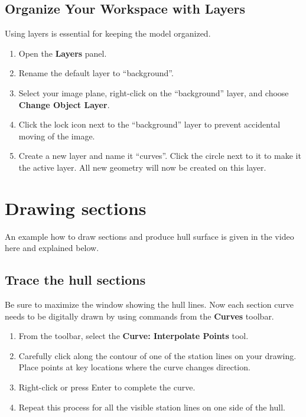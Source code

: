 \documentclass{article}
\begin{document}
\subsection{Organize Your Workspace with Layers}

Using layers is essential for keeping the model organized.

\begin{enumerate}
\item Open the \textbf{Layers} panel.
\item Rename the default layer to ``background''.
\item Select your image plane, right-click on the ``background'' layer, and choose \textbf{Change Object Layer}.
\item Click the lock icon next to the ``background'' layer to prevent accidental moving of the image.
\item Create a new layer and name it ``curves''. Click the circle next to it to make it the active layer. All new geometry will now be created on this layer.
\end{enumerate}

\section{Drawing sections}

An example how to draw sections and produce hull surface is given in the video here and explained below.

\subsection{Trace the hull sections}

Be sure to maximize the window showing the hull lines. Now each section curve needs to be digitally drawn by using commands from the \textbf{Curves} toolbar.

\begin{enumerate}
\item From the toolbar, select the \textbf{Curve: Interpolate Points} tool.
\item Carefully click along the contour of one of the station lines on your drawing. Place points at key locations where the curve changes direction.
\item Right-click or press Enter to complete the curve.
\item Repeat this process for all the visible station lines on one side of the hull.
\end{enumerate}
\end{document}
